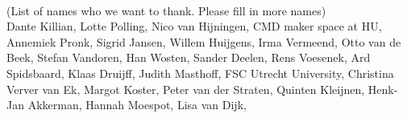 \documentclass{report}
\begin{document}
\clearpage
\begin{figure}
    \centering
\end{figure}
\clearpage

 \\

(List of names who we want to thank. Please fill in more names)\\

Dante Killian, Lotte Polling, Nico van Hijningen, CMD maker space at HU, Annemiek Pronk, Sigrid Jansen, Willem Huijgens, Irma Vermeend, Otto van de Beek, Stefan Vandoren, Han Wosten, Sander Deelen, Rens Voesenek, Ard Spidsbaard, Klaas Druijff, Judith Masthoff, FSC Utrecht University, Christina Verver van Ek, Margot Koster, Peter van der Straten, Quinten Kleijnen, Henk-Jan Akkerman, Hannah Moespot, Lisa van Dijk, 
\end{document}
